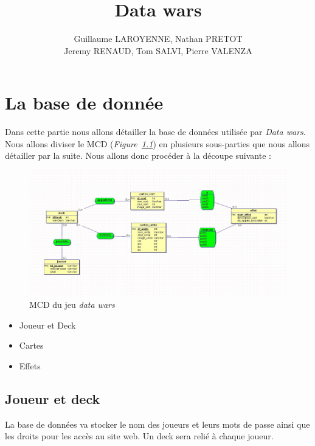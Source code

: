 \documentclass[a4paper,11pt]{report}
\title{Data wars }
\author{Guillaume LAROYENNE, Nathan PRETOT \\ Jeremy RENAUD, Tom SALVI, Pierre VALENZA}
\begin{document}
\maketitle
\tableofcontents
\begin{abstract}

\end{abstract}



\chapter{La base de donnée}
    Dans cette partie nous allons détailler la base de données utilisée par \textit{Data wars}. Nous allons diviser le MCD (\textit{Figure~\ref{fig1}}) en plusieurs sous-parties que nous allons détailler par la suite. Nous allons donc procéder à la découpe suivante : 
    
    \begin{figure}[th]
      \begin{center}
        \includegraphics[scale=0.4]{Assets/MCD.png}
        \caption{MCD du jeu \textit{data wars}}
        \label{fig1}
      \end{center}
    \end{figure}
    
    \begin{itemize}
      \item Joueur et Deck
      \item Cartes
      \item Effets
    \end{itemize}

    \section{Joueur et deck}
      La base de données va stocker le nom des joueurs et leurs mots de passe ainsi que les droits pour les accès au site web. Un deck sera relié à chaque joueur.
    
\end{document}
